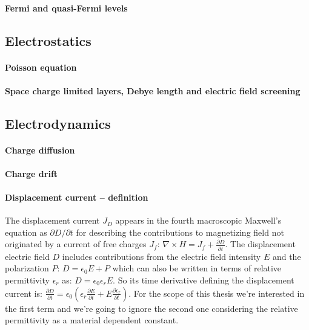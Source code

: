 		\paragraph{Fermi and quasi-Fermi levels}

	\subsection{Electrostatics}

		\paragraph{Poisson equation}

		\paragraph{Space charge limited layers, Debye length and electric field screening}\label{intro-space_charge}
		\cite{WikipediaDebye2019}

	\subsection{Electrodynamics}

		\paragraph{Charge diffusion}

		\paragraph{Charge drift}

		\paragraph{Displacement current -- definition}\label{intro_displacement_current} The displacement current $J_D$ appears in the fourth macroscopic Maxwell's equation as $\partial D / \partial t$ for describing the contributions to magnetizing field not originated by a current of free charges $J_f$: $\nabla \times H = J_f + \frac{\partial D}{\partial t}$.
		The displacement electric field $D$ includes contributions from the electric field intensity $E$ and the polarization $P$: $D=\epsilon_0 E + P$ which can also be written in terms of relative permittivity $\epsilon_r$ as: $D= \epsilon_0 \epsilon_r E$.
		So its time derivative defining the displacement current is: $\frac{\partial D}{\partial t} = \epsilon_0 (\epsilon_r\frac{\partial E}{\partial t} + E\frac{\partial \epsilon_r}{\partial t})$.
		For the scope of this thesis we're interested in the first term and we're going to ignore the second one considering the relative permittivity as a material dependent constant.


